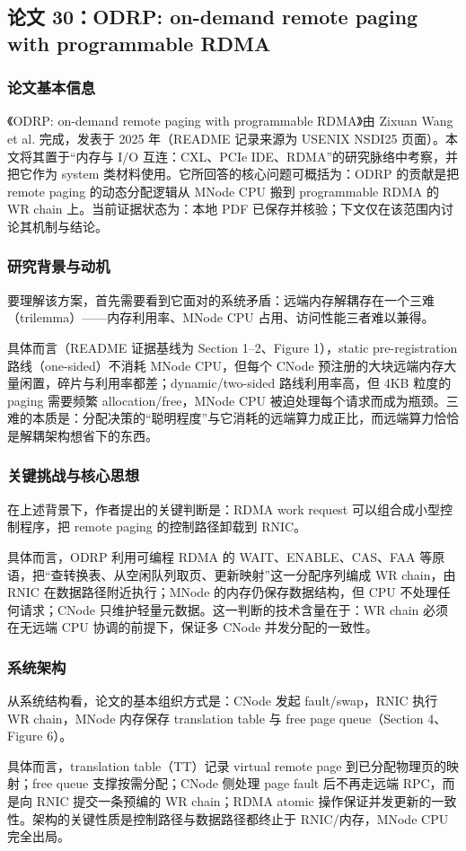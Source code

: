 \documentclass[11pt]{ctexart}
\begin{document}
\subsection{论文 30：ODRP: on-demand remote paging with programmable RDMA}
\subsubsection{论文基本信息}
《ODRP: on-demand remote paging with programmable RDMA》由 Zixuan Wang et al. 完成，发表于 2025 年（README 记录来源为 USENIX NSDI25 页面）。本文将其置于“内存与 I/O 互连：CXL、PCIe IDE、RDMA”的研究脉络中考察，并把它作为 system 类材料使用。它所回答的核心问题可概括为：ODRP 的贡献是把 remote paging 的动态分配逻辑从 MNode CPU 搬到 programmable RDMA 的 WR chain 上。当前证据状态为：本地 PDF 已保存并核验；下文仅在该范围内讨论其机制与结论。\cite{wang2025odrp}\par
\subsubsection{研究背景与动机}
要理解该方案，首先需要看到它面对的系统矛盾：远端内存解耦存在一个三难（trilemma）——内存利用率、MNode CPU 占用、访问性能三者难以兼得。\par
具体而言（README 证据基线为 Section 1--2、Figure 1），static pre-registration 路线（one-sided）不消耗 MNode CPU，但每个 CNode 预注册的大块远端内存大量闲置，碎片与利用率都差；dynamic/two-sided 路线利用率高，但 4KB 粒度的 paging 需要频繁 allocation/free，MNode CPU 被迫处理每个请求而成为瓶颈。三难的本质是：分配决策的“聪明程度”与它消耗的远端算力成正比，而远端算力恰恰是解耦架构想省下的东西。\par
\subsubsection{关键挑战与核心思想}
在上述背景下，作者提出的关键判断是：RDMA work request 可以组合成小型控制程序，把 remote paging 的控制路径卸载到 RNIC。\par
具体而言，ODRP 利用可编程 RDMA 的 WAIT、ENABLE、CAS、FAA 等原语，把“查转换表、从空闲队列取页、更新映射”这一分配序列编成 WR chain，由 RNIC 在数据路径附近执行；MNode 的内存仍保存数据结构，但 CPU 不处理任何请求；CNode 只维护轻量元数据。这一判断的技术含量在于：WR chain 必须在无远端 CPU 协调的前提下，保证多 CNode 并发分配的一致性。\par
\subsubsection{系统架构}
从系统结构看，论文的基本组织方式是：CNode 发起 fault/swap，RNIC 执行 WR chain，MNode 内存保存 translation table 与 free page queue（Section 4、Figure 6）。\par
具体而言，translation table（TT）记录 virtual remote page 到已分配物理页的映射；free queue 支撑按需分配；CNode 侧处理 page fault 后不再走远端 RPC，而是向 RNIC 提交一条预编的 WR chain；RDMA atomic 操作保证并发更新的一致性。架构的关键性质是控制路径与数据路径都终止于 RNIC/内存，MNode CPU 完全出局。\par
\end{document}
